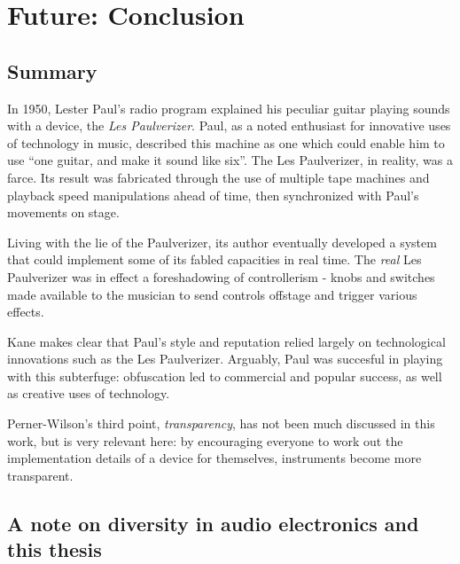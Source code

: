 \chapter{Future: Conclusion}\label{conclusion}
 
\section{Summary}

In 1950, Lester Paul's radio program explained his peculiar guitar playing sounds with a device, the \emph{Les Paulverizer}. Paul, as a noted enthusiast for innovative uses of technology in music, described this machine as one which could enable him to use ``one guitar, and make it sound like six''. The Les Paulverizer, in reality, was a farce. Its result was fabricated through the use of multiple tape machines and playback speed manipulations ahead of time, then synchronized with Paul's movements on stage. 

Living with the lie of the Paulverizer, its author eventually developed a system that could implement some of its fabled capacities in real time. The \emph{real} Les Paulverizer was in effect a foreshadowing of controllerism - knobs and switches made available to the musician to send controls offstage and trigger various effects\citep{kane2014}. 

Kane makes clear that Paul's style and reputation relied largely on technological innovations such as the Les Paulverizer. Arguably, Paul was succesful in playing with this subterfuge: obfuscation led to commercial and popular success, as well as creative uses of technology. 

Perner-Wilson's third point, \emph{transparency}, has not been much discussed in this work, but is very relevant here: by encouraging everyone to work out the implementation details of a device for themselves, instruments become more transparent.  


\section{A note on diversity in audio electronics and this thesis}


